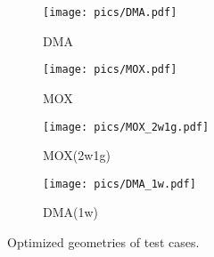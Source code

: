 

\begin{figure}
\begin{subfigure}{.50\textwidth}
  \centering
  \texttt{[image: pics/DMA.pdf]}
  \caption{DMA}
  \label{fig:sfig1a}
\end{subfigure}
\hspace{0.1 in}
\begin{subfigure}{.50\textwidth}
  \centering
  \texttt{[image: pics/MOX.pdf]}
  \caption{MOX}
  \label{fig:sfig1b}
\end{subfigure}
\begin{subfigure}{.50\textwidth}
  \centering
  \texttt{[image: pics/MOX\_2w1g.pdf]}
  \caption{MOX(2w1g)}
  \label{fig:sfig1c}
\end{subfigure}
\hspace{0.1 in}
\begin{subfigure}{.50\textwidth}
  \centering
  \texttt{[image: pics/DMA\_1w.pdf]}
  \caption{DMA(1w)}
  \label{fig:sfig1d}
\end{subfigure}
\caption{Optimized geometries of test cases.}
\label{fig:fig1}
\end{figure}
